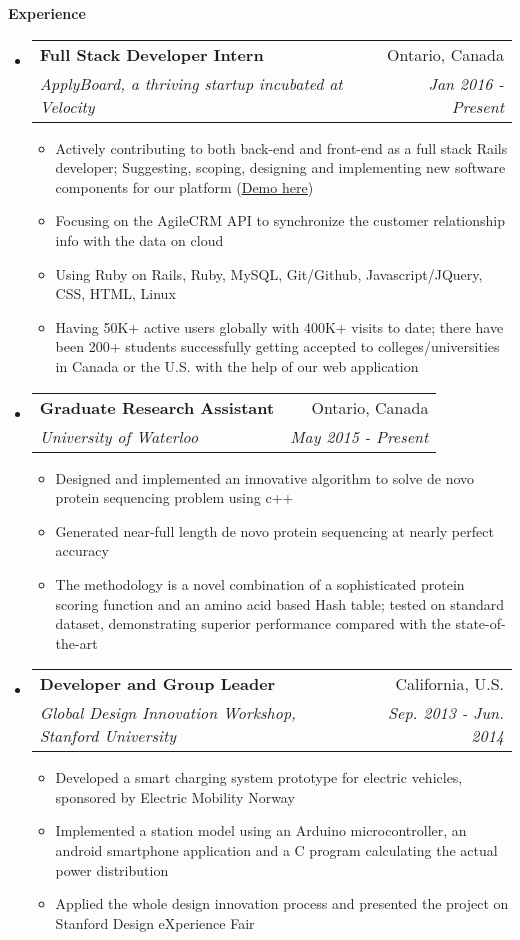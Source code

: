 \documentclass[letterpaper,10pt]{article}
\makeatletter
\newcommand{\resitem}[1]{\item #1 \vspace{-2pt}}
\newcommand{\resheading}[1]{{\large \colorbox{mygrey}{\begin{minipage}{\textwidth}{\textbf{#1 \vphantom{p\^{E}}}}\end{minipage}}}}
\newcommand{\ressubheading}[4]{
\begin{tabular*}{7.0in}{l@{\extracolsep{\fill}}r}
		\textbf{#1} & #2 \\
		\textit{#3} & \textit{#4} \\
\end{tabular*}\vspace{-6pt}}
\makeatother
\begin{document}
\resheading{Experience}
\begin{itemize}
\itemsep0em
\item 
    \ressubheading{Full Stack Developer Intern}{Ontario, Canada}{ApplyBoard, a thriving startup incubated at Velocity}{Jan 2016 - Present}
	\begin{itemize}
            \resitem{Actively contributing to both back-end and front-end as a full stack Rails developer; Suggesting, scoping, designing and implementing new software components for our platform (\href{https://www.applyboard.com/demo}{\underline{Demo here}})}
		\resitem{Focusing on the AgileCRM API to synchronize the customer relationship info with the data on cloud}
		\resitem{Using Ruby on Rails, Ruby, MySQL, Git/Github, Javascript/JQuery, CSS, HTML, Linux}
        \resitem{Having 50K+ active users globally with 400K+ visits to date; there have been 200+ students successfully getting accepted to colleges/universities in Canada or the U.S. with the help of our web application }
	\end{itemize}

\item
	\ressubheading{Graduate Research Assistant}{Ontario, Canada}{University of Waterloo}{May 2015 - Present}
	\begin{itemize}
		\resitem{Designed and implemented an innovative algorithm to solve de novo protein sequencing problem using c++}
		\resitem{Generated near-full length de novo protein sequencing at nearly perfect accuracy}
		\resitem{The methodology is a novel combination of a sophisticated protein scoring function and an amino acid based Hash table; tested on standard dataset, demonstrating superior performance compared with the state-of-the-art}
	\end{itemize}
\item
	\ressubheading{Developer and Group Leader}{California, U.S.}{Global Design Innovation Workshop, Stanford University}{ Sep. 2013 - Jun. 2014}
	\begin{itemize}
		\resitem{Developed a smart charging system prototype for electric vehicles, sponsored by Electric Mobility Norway}
        \resitem{Implemented a station model using an Arduino microcontroller, an android smartphone application and a C program calculating the actual power distribution}
		\resitem{Applied the whole design innovation process and presented the project on Stanford Design eXperience Fair}
	\end{itemize}
\end{itemize}
\end{document}
